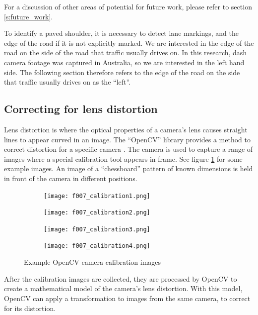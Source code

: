 \documentclass[11pt,twoside]{report}
\begin{document}
For a discussion of other areas of potential for future work, please refer to section \ref{s:future_work}.

To identify a paved shoulder, it is necessary to detect lane markings, and the edge of the road if it is not explicitly marked.  We are interested in the edge of the road on the side of the road that traffic usually drives on.  In this research, dash camera footage was captured in Australia, so we are interested in the left hand side.  The following section therefore refers to the edge of the road on the side that traffic usually drives on as the ``left''.


\subsection{Correcting for lens distortion}

Lens distortion is where the optical properties of a camera's lens causes straight lines to appear curved in an image.  The ``OpenCV'' library provides a method to correct distortion for a specific camera \cite{distortion}.  The camera is used to capture a range of images where a special calibration tool appears in frame.  See figure \ref{fig:calibration} for some example images.  An image of a ``chessboard'' pattern of known dimensions is held in front of the camera in different positions.

\begin{figure}[h]
\centering
\begin{subfigure}{0.24\textwidth}
	\texttt{[image: f007\_calibration1.png]}
\end{subfigure}
\hfill
\begin{subfigure}{0.24\textwidth}
	\texttt{[image: f007\_calibration2.png]}
\end{subfigure}
\hfill
\begin{subfigure}{0.24\textwidth}
	\texttt{[image: f007\_calibration3.png]}
\end{subfigure}
\hfill
\begin{subfigure}{0.24\textwidth}
	\texttt{[image: f007\_calibration4.png]}
\end{subfigure}
\caption{Example OpenCV camera calibration images}
\label{fig:calibration}
\end{figure}

After the calibration images are collected, they are processed by OpenCV to create a mathematical model of the camera's lens distortion.  With this model, OpenCV can apply a transformation to images from the same camera, to correct for its distortion.
\end{document}
